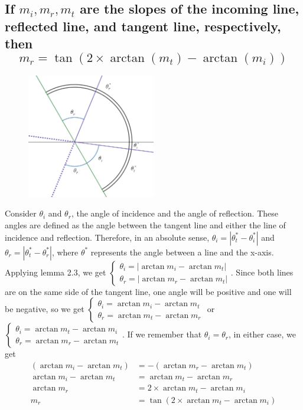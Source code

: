 \documentclass[11pt, oneside]{article}   	%
\begin{document}
\subsection{If $m_i, m_r, m_t$ are the slopes of the incoming line, reflected line, 
and tangent line, respectively, then $$m_r = \tan\left(2\times \arctan(m_t) - \arctan(m_i)\right)$$}
	\begin{figure}
		\centering
		\includegraphics[width=0.5\textwidth]{2.4 visual aid.png}
	\end{figure}
	Consider $\theta_i$ and $\theta_r$, the angle of incidence and the angle of reflection.  These angles are 
	defined as the angle between the tangent line and either the line of incidence and reflection. Therefore,
	in an absolute sense, $\theta_i = |\theta_t^*-\theta_i^*|$ and \\$\theta_r = |\theta_t^*-\theta_r^*|$, where
	$\theta^*$ represents the angle between a line and the x-axis. Applying lemma 2.3, we get 
	$\begin{cases}
		\theta_i=|\arctan{m_i} - \arctan{m_t}|\\
		\theta_r=|\arctan{m_r} -\arctan{m_t}|
	\end{cases}$.
	Since both lines are on the same side of the tangent line, one angle will be positive and one will be negative, 
	so we get
	$\begin{cases}
		\theta_i=\arctan{m_i} - \arctan{m_t}\\
		\theta_r=\arctan{m_t} - \arctan{m_r}
	\end{cases}$
	or 
	$\begin{cases}
		\theta_i=\arctan{m_t} - \arctan{m_i}\\
		\theta_r=\arctan{m_r} - \arctan{m_t}
	\end{cases}$.
	If we remember that $\theta_i=\theta_r$, in either case, we get
	\begin{align*}
		(\arctan m_i -\arctan m_t ) &= -(\arctan m_r - \arctan m_t )\\
		\arctan m_i  - \arctan m_t  &= \arctan m_t  -\arctan m_r \\
		\arctan m_r  &= 2\times \arctan m_t  - \arctan m_i \\
		m_r &= \tan\left(2\times \arctan m_t  - \arctan m_i \right)
	\end{align*}\\
\end{document}
